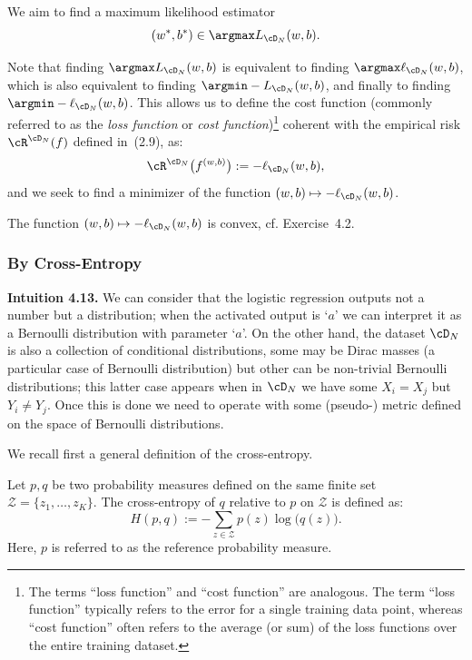 We aim to find a maximum likelihood estimator
\[
(w^*, b^*) \in \argmax L_{\cD_N}(w, b).
\]

Note that finding $\argmax L_{\cD_N}(w, b)$ is equivalent to finding $\argmax \ell_{\cD_N}(w, b)$,
which is also equivalent to finding $\argmin -L_{\cD_N}(w, b)$, and finally to finding
$\argmin -\ell_{\cD_N}(w, b)$. This allows us to define the cost function (commonly referred
to as the \emph{loss function} or \emph{cost function})\footnote{The terms ``loss function'' and ``cost function'' are analogous. The term ``loss function'' typically refers to the error for a single training data point, whereas ``cost function'' often refers to the average (or sum) of the loss functions over the entire training dataset.} coherent with the empirical risk
$\cR^{\cD_N}(f)$ defined in~(2.9), as:
\[
\cR^{\cD_N}\bigl( f^{(w,b)} \bigr) := -\ell_{\cD_N}(w, b),
\]
and we seek to find a minimizer of the function $(w, b) \mapsto -\ell_{\cD_N}(w, b)$.

\begin{remark}
The function $(w, b) \mapsto -\ell_{\cD_N}(w, b)$ is convex, cf. Exercise~4.2.
\end{remark}

\subsubsection*{By Cross-Entropy}

\begin{tcolorbox}[remarkbox]
\textbf{Intuition 4.13.} We can consider that the logistic regression outputs
not a number but a distribution; when the activated output is `$a$' we can
interpret it as a Bernoulli distribution with parameter `$a$'. On the other
hand, the dataset $\cD_N$ is also a collection of conditional distributions,
some may be Dirac masses (a particular case of Bernoulli distribution)
but other can be non-trivial Bernoulli distributions; this latter case
appears when in $\cD_N$ we have some $X_i = X_j$ but $Y_i \ne Y_j$. Once this
is done we need to operate with some (pseudo-) metric defined on the
space of Bernoulli distributions.
\end{tcolorbox}

We recall first a general definition of the cross-entropy.

\begin{definition}
Let $p, q$ be two probability measures defined on the same finite set $\mathcal{Z} = \{z_1, \ldots, z_K\}$.
The cross-entropy of $q$ relative to $p$ on $\mathcal{Z}$ is defined as:
\begin{equation}\label{eq:ch4-ce-discrete}
H(p, q) := -\sum_{z \in \mathcal{Z}} p(z) \log\bigl( q(z) \bigr).
\end{equation}
Here, $p$ is referred to as the reference probability measure.
\end{definition}


